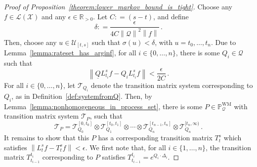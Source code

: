\documentclass[10pt,a4paper]{paper}
\theoremstyle{definition}
\newcommand{\reals}{\mathbb{R}}
\newcommand{\realspos}{\reals_{>0}}
\newcommand{\states}{\mathcal{X}}
\newcommand{\processes}{\mathbb{P}}
\newcommand{\wmprocesses}{\processes^{\mathrm{WM}}}
\newcommand{\gambles}{\mathcal{L}}
\newcommand{\gamblesX}{\gambles(\states)}
\newcommand{\rateset}{\mathcal{Q}}
\newcommand{\lrate}{\underline{Q}}
\newcommand{\norm}[1]{\left\lVert #1 \right\rVert}
\newcommand{\coloneqq}{:\!=}
\begin{document}
\begin{proof}[Proof of Proposition~\ref{theorem:lower_markov_bound_is_tight}]
Choose any $f\in\gamblesX$ and any $\epsilon\in\realspos$. Let $C\coloneqq (s-t)$, and define
\begin{equation}\label{eq:delta_required_for_tight_bound}
\delta \coloneqq \frac{\epsilon}{4C\norm{\mathcal{Q}}^2\norm{f}}\,.
\end{equation}
Then, choose any $u\in\mathcal{U}_{[t,s]}$ such that $\sigma(u)<\delta$, with $u=t_0,\ldots,t_n$. Due to Lemma~\ref{lemma:rateset_has_arginf}, for all $i\in\{0,\ldots,n\}$, there is some $Q_i\in\rateset$ such that
\begin{equation}\label{eq:prop_lower_markov_tight_rate_error}
\norm{\lrate L_{t_i}^sf - Q_iL_{t_i}^sf} < \frac{\epsilon}{2C}\,.
\end{equation}
For all $i\in\{0,\ldots,n\}$, let $\mathcal{T}_{Q_i}$ denote the transition matrix system corresponding to $Q_i$, as in Definition~\ref{def:systemfromQ}. Then, by Lemma~\ref{lemma:nonhomogeneous_in_process_set}, there is some $P\in\wmprocesses_\rateset$ with transition matrix system $\mathcal{T}_P$, such that
\begin{equation*}
\mathcal{T}_P = \mathcal{T}_{Q_0}^{[0,t_0]}\otimes \mathcal{T}_{Q_1}^{[t_0,t_1]}\otimes \cdots \otimes \mathcal{T}_{Q_n}^{[t_{n-1},t_n]} \otimes \mathcal{T}_{Q_n}^{[t_{n},\infty)}\,.
\end{equation*}
It remains to show that this $P$ has a corresponding transition matrix $T_t^s$ which satisfies $\norm{L_t^sf - T_t^sf} < \epsilon$. We first note that, for all $i\in\{1,\ldots,n\}$, the transition matrix $T_{t_{i-1}}^{t_i}$ corresponding to $P$ satisfies $T_{t_{i-1}}^{t_i} = e^{Q_i\cdot\Delta_i}$.


\end{proof}
\end{document}
